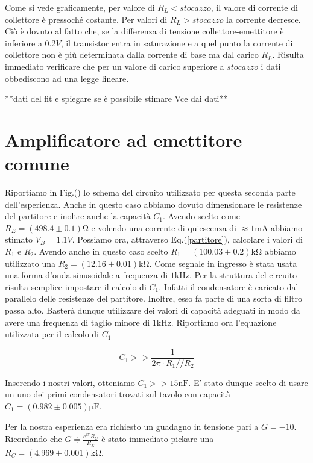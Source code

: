 Come si vede graficamente, per valore di $R_L<stocazzo$, il valore di corrente di collettore è pressoché costante. Per valori di $R_L>stocazzo$ la corrente decresce. Ciò è dovuto al fatto che, se la differenza di tensione collettore-emettitore è inferiore a $0.2V$, il transistor entra in saturazione e a quel punto la corrente di  collettore non è più determinata dalla corrente di base ma dal carico $R_L$. Risulta immediato verificare che  per un valore di carico superiore a $stocazzo$ i dati obbediscono ad una legge lineare. 

**dati del fit e spiegare se è possibile stimare Vce dai dati**   

\section{Amplificatore ad emettitore comune}

Riportiamo in Fig.() lo schema del circuito utilizzato per questa seconda parte dell'esperienza. Anche in questo caso abbiamo dovuto dimensionare le resistenze del partitore e inoltre anche la capacità $C_1$. Avendo scelto come $R_E=(498.4\pm0.1)\si{\ohm}$ e volendo una corrente di quiescenza di $\approx 1\si{\milli\ampere}$ abbiamo stimato $V_B=1.1V$. Possiamo ora, attraverso Eq.(\ref{partitore}), calcolare i valori di $R_1$ e $R_2$. Avendo anche in questo caso scelto $R_1=(100.03\pm0.2)\si{\kilo\ohm}$ abbiamo utilizzato una $R_2=(12.16\pm0.01)\si{\kilo\ohm}$. Come segnale in ingresso è stata usata una forma d'onda sinusoidale a frequenza di $1\si{\kilo\hertz}$. Per la struttura del circuito risulta semplice impostare il calcolo di $C_1$. Infatti il condensatore è caricato dal parallelo delle resistenze del partitore. Inoltre, esso fa parte di una sorta di filtro passa alto. Basterà dunque utilizzare dei valori di capacità adeguati in modo da avere una frequenza di taglio minore di $1\si{\kilo\hertz}$. Riportiamo ora l'equazione utilizzata per il calcolo di $C_1$

\begin{equation}
C_1>>\frac{1}{2 \pi \cdot R_1 // R_2}
\end{equation}

Inserendo i nostri valori, otteniamo $C_1>>15\si{\nano\farad}$. E' stato dunque scelto di usare un uno dei primi condensatori trovati sul tavolo con capacità $C_1=(0.982\pm0.005)\si{\micro\farad}$. 

Per la nostra esperienza era richiesto un guadagno in tensione pari a $G=-10$. Ricordando che $G\doteqdot \frac{e^{i\pi}R_C}{R_E}$ è stato immediato pickare una $R_C=(4.969\pm0.001)\si{\kilo\ohm}$. 

